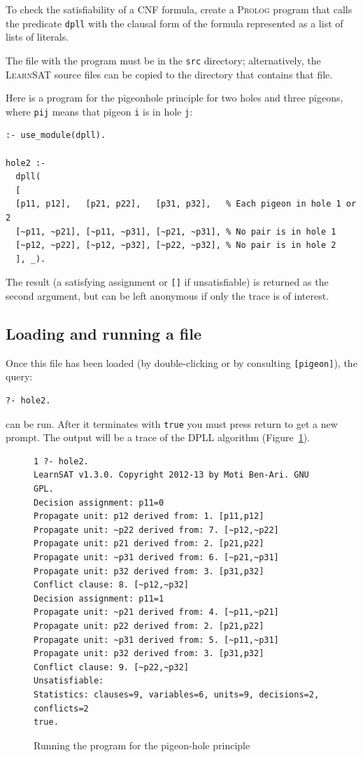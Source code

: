 \documentclass[11pt]{report}
\newcommand*{\p}[1]{\textup{\texttt{#1}}}
\newcommand*{\ls}{\textsc{LearnSAT}}
\newcommand*{\pl}{\textsc{Prolog}}
\begin{document}
To check the satisfiability of a CNF formula, create a \pl{} program
that calls the predicate \p{dpll} with the clausal form of the formula
represented as a list of lists of literals.

The file with the program must be in the \p{src} directory;
alternatively, the \ls{} source files can be copied to the directory
that contains that file.

\newpage

Here is a program for the pigeonhole principle for two holes and three
pigeons, where \p{pij} means that pigeon \p{i} is in hole \p{j}:

\begin{verbatim}
:- use_module(dpll).

hole2 :-
  dpll(
  [
  [p11, p12],   [p21, p22],   [p31, p32],   % Each pigeon in hole 1 or 2 
  [~p11, ~p21], [~p11, ~p31], [~p21, ~p31], % No pair is in hole 1
  [~p12, ~p22], [~p12, ~p32], [~p22, ~p32], % No pair is in hole 2
  ], _).
\end{verbatim}

The result (a satisfying assignment or \p{[]} if unsatisfiable) is
returned as the second argument, but can be left anonymous if only
the trace is of interest.

\subsection{Loading and running a file}

Once this file has been loaded (by double-clicking or by consulting
\p{[pigeon]}), the query:
\begin{verbatim}
?- hole2. 
\end{verbatim}

can be run. After it terminates with \p{true} you must press
return to get a new prompt. The output will be a trace of the DPLL
algorithm (Figure~\ref{fig.pigeon}).

\begin{figure}[tbp]
\begin{verbatim}
1 ?- hole2.
LearnSAT v1.3.0. Copyright 2012-13 by Moti Ben-Ari. GNU GPL.
Decision assignment: p11=0
Propagate unit: p12 derived from: 1. [p11,p12]
Propagate unit: ~p22 derived from: 7. [~p12,~p22]
Propagate unit: p21 derived from: 2. [p21,p22]
Propagate unit: ~p31 derived from: 6. [~p21,~p31]
Propagate unit: p32 derived from: 3. [p31,p32]
Conflict clause: 8. [~p12,~p32]
Decision assignment: p11=1
Propagate unit: ~p21 derived from: 4. [~p11,~p21]
Propagate unit: p22 derived from: 2. [p21,p22]
Propagate unit: ~p31 derived from: 5. [~p11,~p31]
Propagate unit: p32 derived from: 3. [p31,p32]
Conflict clause: 9. [~p22,~p32]
Unsatisfiable:
Statistics: clauses=9, variables=6, units=9, decisions=2, conflicts=2
true.
\end{verbatim}
\caption{Running the program for the pigeon-hole principle}\label{fig.pigeon}
\end{figure}
\end{document}
